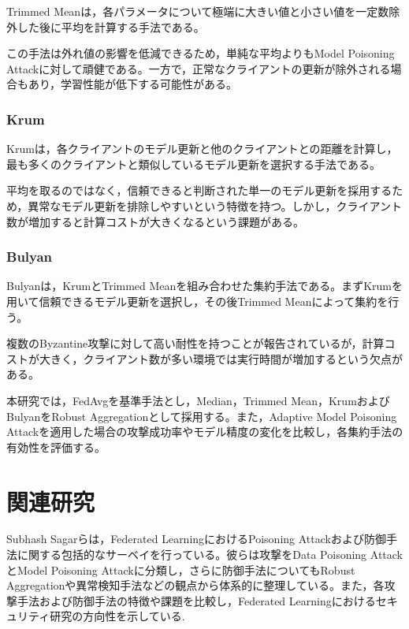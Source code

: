 \documentclass[a4j, twocolumn, dvipdfmx]{jsarticle}  %
\begin{document}
Trimmed Meanは，各パラメータについて極端に大きい値と小さい値を一定数除外した後に平均を計算する手法である。

この手法は外れ値の影響を低減できるため，単純な平均よりもModel Poisoning Attackに対して頑健である。一方で，正常なクライアントの更新が除外される場合もあり，学習性能が低下する可能性がある。

\subsubsection{Krum}

Krumは，各クライアントのモデル更新と他のクライアントとの距離を計算し，最も多くのクライアントと類似しているモデル更新を選択する手法である。

平均を取るのではなく，信頼できると判断された単一のモデル更新を採用するため，異常なモデル更新を排除しやすいという特徴を持つ。しかし，クライアント数が増加すると計算コストが大きくなるという課題がある。

\subsubsection{Bulyan}

Bulyanは，KrumとTrimmed Meanを組み合わせた集約手法である。まずKrumを用いて信頼できるモデル更新を選択し，その後Trimmed Meanによって集約を行う。

複数のByzantine攻撃に対して高い耐性を持つことが報告されているが，計算コストが大きく，クライアント数が多い環境では実行時間が増加するという欠点がある。

本研究では，FedAvgを基準手法とし，Median，Trimmed Mean，KrumおよびBulyanをRobust Aggregationとして採用する。また，Adaptive Model Poisoning Attackを適用した場合の攻撃成功率やモデル精度の変化を比較し，各集約手法の有効性を評価する。


\section{関連研究}

Subhash Sagarらは，Federated LearningにおけるPoisoning Attackおよび防御手法に関する包括的なサーベイを行っている。彼らは攻撃をData Poisoning AttackとModel Poisoning Attackに分類し，さらに防御手法についてもRobust Aggregationや異常検知手法などの観点から体系的に整理している。また，各攻撃手法および防御手法の特徴や課題を比較し，Federated Learningにおけるセキュリティ研究の方向性を示している\cite{sagar2023survey}.
\end{document}
